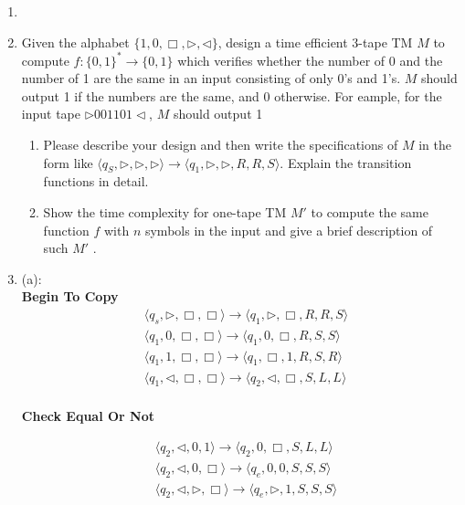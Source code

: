 \documentclass[12pt,a4paper]{article}
\makeatletter
\newtheorem*{solution}{Solution}
\theoremstyle{definition}
\renewenvironment{solution}[1][Solution] {\par\pushQED{\qed}\normalfont\topsep6\p@\@plus6\p@\relax\trivlist\item[\hskip\labelsep\bfseries#1\@addpunct{.}]\ignorespaces}{\popQED\endtrivlist\@endpefalse} \makeatother
\makeatother
\begin{document}
\begin{enumerate}
\begin{solution}
    
    \end{solution}
    

    \item 
    Given the alphabet $\{1, 0, \Box, \triangleright, \triangleleft\}$, design a time efficient 3-tape TM $M$ to compute $f:\{0,1\}^*\rightarrow\{0,1\}$ which verifies whether the number of 0 and the number of 1 are the same in an input consisting of only 0's and 1's. $M$ should output 1 if the numbers are the same, and 0 otherwise. For eample, for the input tape $\triangleright 001101\triangleleft$, $M$ should output 1
    
    \begin{enumerate}
	    \item
	    Please describe your design and then write the specifications of $M$ in the form like $\langle q_S, \triangleright, \triangleright, \triangleright \rangle \rightarrow \langle q_1, \triangleright,\triangleright,  R, R, S \rangle$. Explain the transition functions in detail.
	    
	    \item 
	    Show the time complexity for one-tape TM $M'$ to compute the same function $f$ with $n$ symbols in the input and give a brief description of such $M'$ .
	
	\end{enumerate}
    

	\begin{solution}
		(a):\\
		
	\textbf{Begin To Copy}
    \begin{equation*}
    \begin{aligned}
    &\langle q_s, \triangleright, \Box, \Box\rangle \rightarrow \langle q_1,    \triangleright, \Box, R, R, S\rangle \\
    &\langle q_1, 0, \Box, \Box\rangle \rightarrow \langle q_1, 0, \Box, R, S, S\rangle \\
    &\langle q_1, 1, \Box, \Box\rangle \rightarrow \langle q_1, \Box, 1, R, S, R\rangle \\
    &\langle q_1, \triangleleft, \Box, \Box\rangle \rightarrow \langle q_2, \triangleleft, \Box, S, L, L\rangle \\
    \end{aligned}
    \end{equation*}

	\textbf{Check Equal Or Not}

    \begin{equation*}
    \begin{aligned}
    &\langle q_2, \triangleleft, 0, 1\rangle \rightarrow \langle q_2, 0, \Box, S, L, L\rangle \\
    &\langle q_2, \triangleleft, 0, \Box\rangle \rightarrow \langle q_e, 0, 0, S, S, S\rangle \\
    &\langle q_2, \triangleleft, \triangleright, \Box\rangle \rightarrow \langle q_e, \triangleright, 1, S, S, S\rangle \\
    \end{aligned}
    \end{equation*}


\end{solution}
\end{enumerate}
\end{document}
